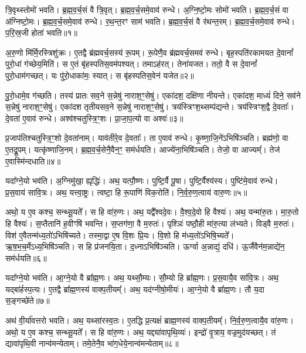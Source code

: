 त्रि॒वृथ्स्तोमो॑ भवति।
ब्र॒ह्म॒व॒र्च॒सं वै त्रि॒वृत्।
ब्र॒ह्म॒व॒र्च॒समे॒वाव॑ रुन्धे।
अ॒ग्नि॒ष्टो॒मः सोमो॑ भवति।
ब्र॒ह्म॒व॒र्च॒सं वा अ॑ग्निष्टो॒मः।
ब्र॒ह्म॒व॒र्च॒समे॒वाव॑ रुन्धे।
र॒थ॒न्त॒रꣳ साम॑ भवति।
ब्र॒ह्म॒व॒र्च॒सं वै र॑थन्त॒रम्।
ब्र॒ह्म॒व॒र्च॒समे॒वाव॑ रुन्धे।
प॒रि॒स्र॒जी होता॑ भवति॥१॥\ip

अ॒रु॒णो मि॑र्मि॒रस्त्रिशु॑क्रः।
ए॒तद्वै ब्र॑ह्म\-वर्च॒सस्य॑ रू॒पम्।
रू॒पेणै॒व ब्र॑ह्म\-वर्च॒समव॑ रुन्धे। 
बृह॒स्पति॑रकामयत दे॒वानां᳚ पुरो॒धां ग॑च्छेय॒मिति॑।
स ए॒तं बृ॑हस्पतिस॒वम॑पश्यत्।
तमाऽह॑रत्।
तेना॑यजत।
ततो॒ वै स दे॒वानां᳚ पुरो॒धाम॑गच्छत्।
यः पु॑रो॒धाका॑मः॒ स्यात्।
स बृ॑हस्पतिस॒वेन॑ यजेत॥२॥\ip

पु॒रो॒धामे॒व ग॑च्छति।
तस्य॑ प्रातः सव॒ने स॒न्नेषु॑ नाराश॒ꣳ॒सेषु॑।
एका॑दश॒ दक्षि॑णा नीयन्ते।
एका॑दश॒ माध्यं॑ दिने॒ सव॑ने स॒न्नेषु॑ नाराश॒ꣳ॒सेषु॑।
एका॑दश तृतीयसव॒ने स॒न्नेषु॑ नाराश॒ꣳ॒सेषु॑।
त्रय॑स्त्रिꣳश॒थ्सम्प॑द्यन्ते।
त्रय॑स्त्रिꣳश॒द्वै दे॒वताः᳚।
दे॒वता॑ ए॒वाव॑ रुन्धे।
अश्व॑श्चतुस्त्रि॒ꣳ॒शः।
प्रा॒जा॒प॒त्यो वा अश्वः॑॥३॥\ip

प्र॒जा\-प॑तिश्चतुस्त्रि॒ꣳ॒शो दे॒वता॑नाम्।
याव॑तीरे॒व दे॒वताः᳚।
ता ए॒वाव॑ रुन्धे।
कृ॒ष्णा॒जि॒ने॑\-ऽभिषि॑ञ्चति।
ब्रह्म॑णो॒ वा ए॒तद्रू॒पम्।
यत्कृ॑ष्णाजि॒नम्।
ब्र॒ह्म॒व॒र्च॒सेनै॒वैन॒ꣳ॒ सम॑र्धयति।
आज्ये॑ना॒भिषि॑ञ्चति।
तेजो॒ वा आज्यम्᳚।
तेज॑ ए॒वास्मि॑न्दधाति॥४॥\ip\anuvakamend[होता॑ भवति यजेत॒ वा अश्वो॑ दधाति]

यदा᳚ग्ने॒यो भव॑ति।
अ॒ग्निमु॑खा॒ ह्यृद्धिः॑।
अथ॒ यत्पौ॒ष्णः।
पुष्टि॒र्वै पू॒षा।
पुष्टि॒र्वैश्य॑स्य।
पुष्टि॑मे॒वाव॑ रुन्धे।
प्र॒स॒वाय॑ सावि॒त्रः।
अथ॒ यत्त्वा॒ष्ट्रः।
त्वष्टा॒ हि रू॒पाणि॑ विक॒रोति॑।
नि॒र्व॒रु॒ण॒त्वाय॑ वारु॒णः॥५॥\ip

अथो॒ य ए॒व कश्च॒ सन्थ्सू॒यते᳚।
स हि वा॑रु॒णः।
अथ॒ यद्वै᳚श्वदे॒वः।
वै॒श्व॒दे॒वो हि वैश्यः॑।
अथ॒ यन्मा॑रु॒तः।
मा॒रु॒तो हि वैश्यः॑।
स॒प्तैतानि॑ ह॒वीꣳषि॑ भवन्ति।
स॒प्तग॑णा॒ वै म॒रुतः॑।
पृश्ञिः॑ पष्ठौ॒ही मा॑रु॒त्या ल॑भ्यते।
विड्वै म॒रुतः॑।
विश॑ ए॒वैतन्म॑ध्य॒तो॑\-ऽभिषि॑च्यते।
तस्मा॒द्वा ए॒ष वि॒शः प्रि॒यः।
वि॒शो हि म॑ध्य॒तो॑\-ऽभिषि॒च्यते᳚।
ऋ॒ष॒भ॒च॒र्मे\-ऽध्य॒भिषि॑ञ्चति।
स हि प्र॑जनयि॒ता।
द॒ध्ना\-ऽभिषि॑ञ्चति।
ऊर्ग्वा अ॒न्नाद्यं॒ दधि॑।
ऊ॒र्जैवैन॑म॒न्नाद्ये॑न॒ सम॑र्धयति॥६॥\ip\anuvakamend[वा॒रु॒णो विड्वै म॒रुतो॒\-ऽष्टौ च॑]

यदा᳚ग्ने॒यो भव॑ति।
आ॒ग्ने॒यो वै ब्रा᳚ह्म॒णः।
अथ॒ यथ्सौ॒म्यः।
सौ॒म्यो हि ब्रा᳚ह्म॒णः।
प्र॒स॒वायै॒व सा॑वि॒त्रः।
अथ॒ यद्बा॑र्\mbox{}हस्प॒त्यः।
ए॒तद्वै ब्रा᳚ह्म॒णस्य॑ वाक्प॒तीयम्᳚।
अथ॒ यद॑ग्नीषो॒मीयः॑।
आ॒ग्ने॒यो वै ब्रा᳚ह्म॒णः।
तौ य॒दा स॒ङ्गच्छे॑ते॥७॥\ip

अथ॑ वी॒र्या॑वत्तरो भवति।
अथ॒ यथ्सा॑रस्व॒तः।
ए॒तद्धि प्र॒त्यक्षं॑ ब्राह्म॒णस्य॑ वाक्प॒तीयम्᳚।
नि॒र्व॒रु॒ण॒त्वायै॒व वा॑रु॒णः।
अथो॒ य ए॒व कश्च॒ सन्थ्सू॒यते᳚।
स हि वा॑रु॒णः।
अथ॒ यद्द्या॑वापृथि॒व्यः॑।
इन्द्रो॑ वृ॒त्राय॒ वज्र॒मुद॑यच्छत्।
तं द्यावा॑पृथि॒वी नान्व॑मन्येताम्।
तमे॒तेनै॒व भा॑ग॒धेये॒नान्व॑मन्येताम्॥८॥\ip

